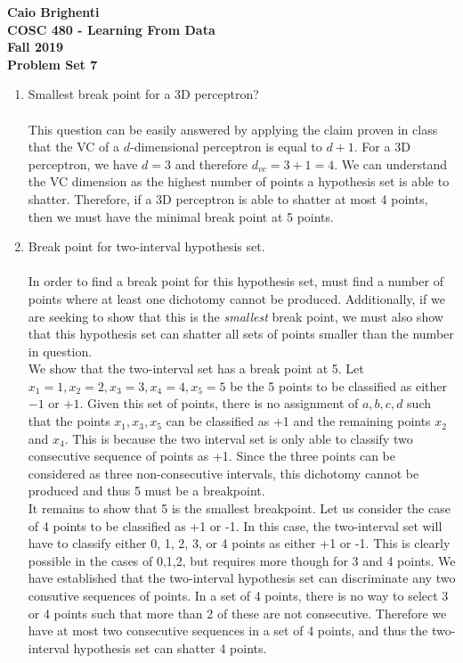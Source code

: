 \documentclass{article}
\begin{document}
\noindent \textbf{Caio Brighenti }\\
\noindent \textbf{COSC 480 - Learning From Data}\\%
\noindent \textbf{Fall 2019}\\%
\noindent \textbf{Problem Set 7}\vspace{1em}\\
\begin{enumerate}
	\item Smallest break point for a 3D perceptron?
	\\\\ This question can be easily answered by applying the claim proven in class that the VC of a $d$-dimensional perceptron is equal to $d+1$. For a 3D perceptron, we have $d=3$ and therefore $d_{vc} = 3+1=4$. We can understand the VC dimension as the highest number of points a hypothesis set is able to shatter. Therefore, if a 3D perceptron is able to shatter at most 4 points, then we must have the minimal break point at 5 points.
	\item Break point for two-interval hypothesis set.
	\\\\ In order to find a break point for this hypothesis set, must find a number of points where at least one dichotomy cannot be produced. Additionally, if we are seeking to show that this is the \emph{smallest} break point, we must also show that this hypothesis set can shatter all sets of points smaller than the number in question.
	\\ We show that the two-interval set has a break point at 5. Let $x_1=1, x_2=2, x_3=3, x_4=4, x_5=5$ be the 5 points to be classified as either $-1$ or $+1$. Given this set of points, there is no assignment of $a,b,c,d$ such that the points $x_1,x_3,x_5$ can be classified as +1 and the remaining points $x_2$ and $x_4$. This is because the two interval set is only able to classify two consecutive sequence of points as +1. Since the three points can be considered as three non-consecutive intervals, this dichotomy cannot be produced and thus 5 must be a breakpoint.
	\\ It remains to show that 5 is the smallest breakpoint. Let us consider the case of 4 points to be classified as +1 or -1. In this case, the two-interval set will have to classify either 0, 1, 2, 3, or 4 points as either +1 or -1. This is clearly possible in the cases of 0,1,2, but requires more though for 3 and 4 points. We have established that the two-interval hypothesis set can discriminate any two consutive sequences of points. In a set of 4 points, there is no way to select 3 or 4 points such that more than 2 of these are not consecutive. Therefore we have at most two consecutive sequences in a set of 4 points, and thus the two-interval hypothesis set can shatter 4 points.

\end{enumerate}
\end{document}
